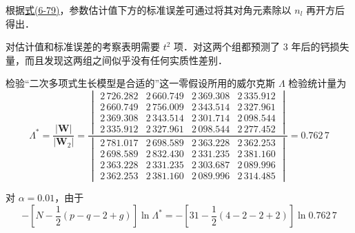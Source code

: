 根据\hyperref[eq:6-79]{式(6-79)}，参数估计值下方的标准误差可通过将其对角元素除以 $n_l$ 再开方后得出．

对估计值和标准误差的考察表明需要 $t^2$ 项．对这两个组都预测了 3 年后的钙损失量，而且发现这两组之间似乎没有任何实质性差别．

检验“二次多项式生长模型是合适的”这一零假设所用的威尔克斯 $\Lambda$ 检验统计量为
\[
\Lambda^*=\frac{|\mathbf{W}|}{|\mathbf{W}_2|}=
\frac{\begin{vmatrix}
2\,726.282&2\,660.749&2\,369.308&2\,335.912\\
2\,660.749&2\,756.009&2\,343.514&2\,327.961\\
2\,369.308&2\,343.514&2\,301.714&2\,098.544\\
2\,335.912&2\,327.961&2\,098.544&2\,277.452
\end{vmatrix}}
{\begin{vmatrix}
2\,781.017&2\,698.589&2\,363.228&2\,362.253\\
2\,698.589&2\,832.430&2\,331.235&2\,381.160\\
2\,363.228&2\,331.235&2\,303.687&2\,089.996\\
2\,362.253&2\,381.160&2\,089.996&2\,314.485
\end{vmatrix}}
=0.762\,7
\]

对 $\alpha=0.01$，由于
\[
-\left[N-\frac{1}{2}(p-q-2+g)\right]\ln\Lambda^*=-\left[31-\frac{1}{2}(4-2-2+2)\right]\ln0.762\,7
\]
